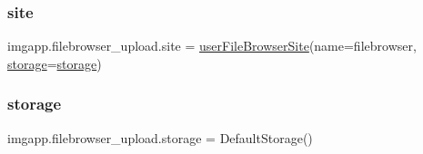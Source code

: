 \subsubsection{\texorpdfstring{site}{site}}
{\footnotesize\ttfamily imgapp.\+filebrowser\+\_\+upload.\+site = \hyperlink{classimgapp_1_1filebrowser__upload_1_1userFileBrowserSite}{user\+File\+Browser\+Site}(name=\textquotesingle{}filebrowser\textquotesingle{}, \hyperlink{namespaceimgapp_1_1filebrowser__upload_ae26049c70fbfba51dec84d62840e6a01}{storage}=\hyperlink{namespaceimgapp_1_1filebrowser__upload_ae26049c70fbfba51dec84d62840e6a01}{storage})}

\mbox{\label{namespaceimgapp_1_1filebrowser__upload_ae26049c70fbfba51dec84d62840e6a01}} 
\subsubsection{\texorpdfstring{storage}{storage}}
{\footnotesize\ttfamily imgapp.\+filebrowser\+\_\+upload.\+storage = Default\+Storage()}


